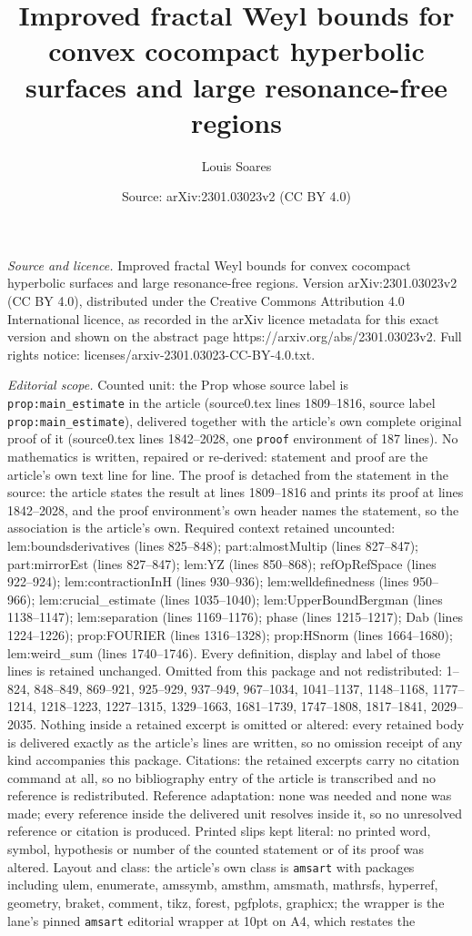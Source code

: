 \documentclass[10pt,a4paper]{amsart}
\title[Improved fractal Weyl bounds for convex cocompact hyperbolic]{Improved fractal Weyl bounds for convex cocompact hyperbolic surfaces and large resonance-free regions}
\author{Louis Soares}
\date{Source: arXiv:2301.03023v2 (CC BY 4.0)}
\begin{document}
\maketitle

\noindent\emph{Source and licence.} Improved fractal Weyl bounds for convex cocompact hyperbolic surfaces and large resonance-free regions. Version arXiv:2301.03023v2 (CC BY 4.0), distributed under the Creative Commons Attribution 4.0 International licence, as recorded in the arXiv licence metadata for this exact version and shown on the abstract page https://arxiv.org/abs/2301.03023v2. Full rights notice: licenses/arxiv-2301.03023-CC-BY-4.0.txt.\par\smallskip

\noindent\textit{Editorial scope.} Counted unit: the Prop whose source label is \texttt{prop:main\_estimate} in the article (source0.tex lines 1809--1816, source label \texttt{prop:main\_estimate}), delivered together with the article's own complete original proof of it (source0.tex lines 1842--2028, one \texttt{proof} environment of 187 lines). No mathematics is written, repaired or re-derived: statement and proof are the article's own text line for line. The proof is detached from the statement in the source: the article states the result at lines 1809--1816 and prints its proof at lines 1842--2028, and the proof environment's own header names the statement, so the association is the article's own. Required context retained uncounted: lem:boundsderivatives (lines 825--848); part:almostMultip (lines 827--847); part:mirrorEst (lines 827--847); lem:YZ (lines 850--868); refOpRefSpace (lines 922--924); lem:contractionInH (lines 930--936); lem:welldefinedness (lines 950--966); lem:crucial\_estimate (lines 1035--1040); lem:UpperBoundBergman (lines 1138--1147); lem:separation (lines 1169--1176); phase (lines 1215--1217); Dab (lines 1224--1226); prop:FOURIER (lines 1316--1328); prop:HSnorm (lines 1664--1680); lem:weird\_sum (lines 1740--1746). Every definition, display and label of those lines is retained unchanged. Omitted from this package and not redistributed: 1--824, 848--849, 869--921, 925--929, 937--949, 967--1034, 1041--1137, 1148--1168, 1177--1214, 1218--1223, 1227--1315, 1329--1663, 1681--1739, 1747--1808, 1817--1841, 2029--2035. Nothing inside a retained excerpt is omitted or altered: every retained body is delivered exactly as the article's lines are written, so no omission receipt of any kind accompanies this package. Citations: the retained excerpts carry no citation command at all, so no bibliography entry of the article is transcribed and no reference is redistributed. Reference adaptation: none was needed and none was made; every reference inside the delivered unit resolves inside it, so no unresolved reference or citation is produced. Printed slips kept literal: no printed word, symbol, hypothesis or number of the counted statement or of its proof was altered. Layout and class: the article's own class is \texttt{amsart} with packages including ulem, enumerate, amssymb, amsthm, amsmath, mathrsfs, hyperref, geometry, braket, comment, tikz, forest, pgfplots, graphicx; the wrapper is the lane's pinned \texttt{amsart} editorial wrapper at 10pt on A4, which restates the 
\end{document}
